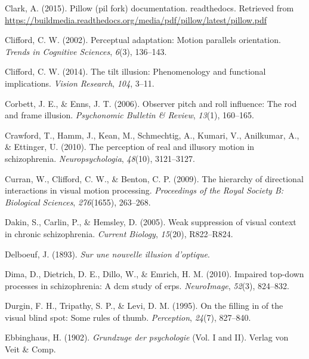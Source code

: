 \documentclass[
  english,
  man,floatsintext]{apa6}
\newlength{\cslhangindent}
\newenvironment{cslreferences}%
  {\setlength{\parindent}{0pt}%
  \everypar{\setlength{\hangindent}{\cslhangindent}}\ignorespaces}%
  {\par}
\begin{document}
\begin{cslreferences}
\leavevmode\hypertarget{ref-clark2015pillow}{}%
Clark, A. (2015). Pillow (pil fork) documentation. readthedocs. Retrieved from \url{https://buildmedia.readthedocs.org/media/pdf/pillow/latest/pillow.pdf}

\leavevmode\hypertarget{ref-clifford2002perceptual}{}%
Clifford, C. W. (2002). Perceptual adaptation: Motion parallels orientation. \emph{Trends in Cognitive Sciences}, \emph{6}(3), 136--143.

\leavevmode\hypertarget{ref-clifford2014tilt}{}%
Clifford, C. W. (2014). The tilt illusion: Phenomenology and functional implications. \emph{Vision Research}, \emph{104}, 3--11.

\leavevmode\hypertarget{ref-corbett2006observer}{}%
Corbett, J. E., \& Enns, J. T. (2006). Observer pitch and roll influence: The rod and frame illusion. \emph{Psychonomic Bulletin \& Review}, \emph{13}(1), 160--165.

\leavevmode\hypertarget{ref-crawford2010perception}{}%
Crawford, T., Hamm, J., Kean, M., Schmechtig, A., Kumari, V., Anilkumar, A., \& Ettinger, U. (2010). The perception of real and illusory motion in schizophrenia. \emph{Neuropsychologia}, \emph{48}(10), 3121--3127.

\leavevmode\hypertarget{ref-curran2009hierarchy}{}%
Curran, W., Clifford, C. W., \& Benton, C. P. (2009). The hierarchy of directional interactions in visual motion processing. \emph{Proceedings of the Royal Society B: Biological Sciences}, \emph{276}(1655), 263--268.

\leavevmode\hypertarget{ref-dakin2005weak}{}%
Dakin, S., Carlin, P., \& Hemsley, D. (2005). Weak suppression of visual context in chronic schizophrenia. \emph{Current Biology}, \emph{15}(20), R822--R824.

\leavevmode\hypertarget{ref-delboeuf1893nouvelle}{}%
Delboeuf, J. (1893). \emph{Sur une nouvelle illusion d'optique}.

\leavevmode\hypertarget{ref-dima2010impaired}{}%
Dima, D., Dietrich, D. E., Dillo, W., \& Emrich, H. M. (2010). Impaired top-down processes in schizophrenia: A dcm study of erps. \emph{NeuroImage}, \emph{52}(3), 824--832.

\leavevmode\hypertarget{ref-durgin1995filling}{}%
Durgin, F. H., Tripathy, S. P., \& Levi, D. M. (1995). On the filling in of the visual blind spot: Some rules of thumb. \emph{Perception}, \emph{24}(7), 827--840.

\leavevmode\hypertarget{ref-ebbinghaus1902grundzuge}{}%
Ebbinghaus, H. (1902). \emph{Grundzuge der psychologie} (Vol. I and II). Verlag von Veit \& Comp.


\end{cslreferences}
\end{document}
